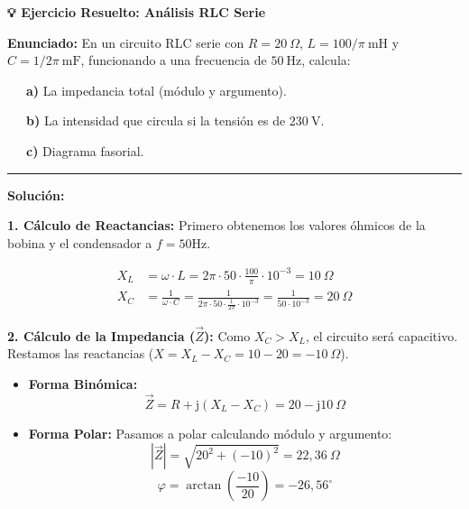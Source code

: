 \documentclass[
  a4paper,
  DIV=11,
  numbers=noendperiod]{scrreprt}
\begin{document}
\begin{tcolorbox}[enhanced jigsaw, breakable, colback=white, left=2mm, leftrule=.75mm, rightrule=.15mm, toprule=.15mm, colframe=quarto-callout-important-color-frame, arc=.35mm, bottomrule=.15mm, opacityback=0]

\vspace{-3mm}\textbf{💡 Ejercicio Resuelto: Análisis RLC Serie}\vspace{3mm}

\textbf{Enunciado:} En un circuito RLC serie con \(R=20\ \Omega\),
\(L=100/\pi\ \text{mH}\) y \(C=1/2\pi\ \text{mF}\), funcionando a una
frecuencia de \(50\ \text{Hz}\), calcula:\\
\strut ~~~\textbf{a)} La impedancia total (módulo y argumento).\\
\strut ~~~\textbf{b)} La intensidad que circula si la tensión es de
\(230\ \text{V}\).\\
\strut ~~~\textbf{c)} Diagrama fasorial.

\begin{center}\rule{0.5\linewidth}{0.5pt}\end{center}

\textbf{Solución:}

\textbf{1. Cálculo de Reactancias:} Primero obtenemos los valores
óhmicos de la bobina y el condensador a \(f=50\text{Hz}\).

\[
\begin{aligned}
X_L &= \omega \cdot L = 2\pi \cdot 50 \cdot \frac{100}{\pi} \cdot 10^{-3} = 10\ \Omega \\
X_C &= \frac{1}{\omega \cdot C} = \frac{1}{2\pi \cdot 50 \cdot \frac{1}{2\pi} \cdot 10^{-3}} = \frac{1}{50 \cdot 10^{-3}} = 20\ \Omega
\end{aligned}
\]

\textbf{2. Cálculo de la Impedancia (\(\vec{Z}\)):} Como \(X_C > X_L\),
el circuito será capacitivo. Restamos las reactancias
(\(X = X_L - X_C = 10 - 20 = -10\ \Omega\)).

\begin{itemize}
\item
  \textbf{Forma Binómica:}
  \[\vec{Z} = R + \mathrm{j}(X_L - X_C) = 20 - \mathrm{j}10\ \Omega\]
\item
  \textbf{Forma Polar:} Pasamos a polar calculando módulo y argumento:
  \[|\vec{Z}| = \sqrt{20^2 + (-10)^2} = 22,36\ \Omega\]
  \[\varphi = \arctan\left(\frac{-10}{20}\right) = -26,56^\circ\]
\end{itemize}

\begin{figure}[H]


\end{figure}
\end{tcolorbox}
\end{document}
